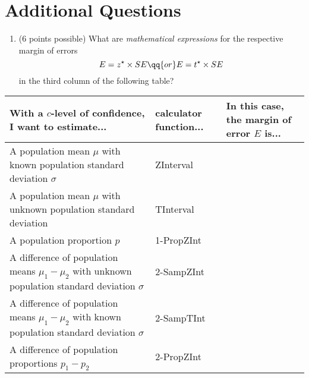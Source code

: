 \documentclass{ccg-topic}
\newcommand{\answer}[1]{}
\begin{document}
\section*{Additional Questions}



\begin{enumerate}[resume]
\item (6 points possible) What are \emph{mathematical expressions} for the respective margin of errors \[E = z^\star \times SE \qq{or} E = t^\star \times SE\] in the third column of the following table? 
\end{enumerate}
\vfill
\begin{center}
\begin{tabular}{| p{5cm} | p{2cm} | p{8cm} |}
\hline
\textbf{With a $c$-level of confidence, I want to estimate...} & \textbf{calculator function...} & \textbf{In this case, the margin of error $E$ is...} \\
\hline
\hline
A population mean $\mu$ with known population standard deviation $\sigma$ & {\answer \texttt{ZInterval}} &  \\[1.5cm]
\hline
A population mean $\mu$ with unknown population standard deviation &{\answer \texttt{TInterval}} & \\[1.5cm]
\hline
A population proportion $p$ & {\answer \texttt{1-PropZInt}}& \\[1.5cm]
\hline
A difference of population means $\mu_1 - \mu_2$ with unknown population standard deviation $\sigma$  &{\answer \texttt{2-SampZInt}} &\\[1.5cm]
\hline
A difference of population means $\mu_1 - \mu_2$ with known population standard deviation $\sigma$  & {\answer \texttt{2-SampTInt}}&\\[1.5cm]
\hline
A difference of population proportions $p_1 - p_2$ &{\answer \texttt{2-PropZInt}} &\\[1.5cm]
\hline
\end{tabular}
\end{center}
\end{document}
